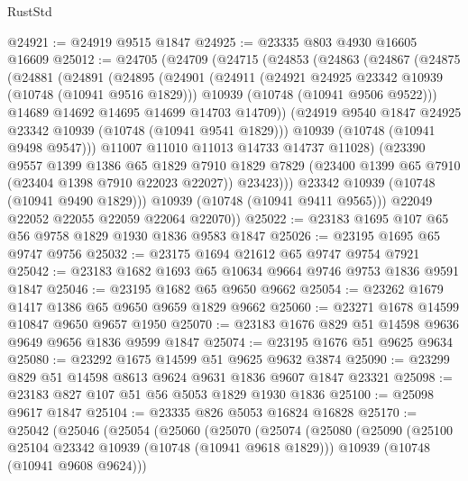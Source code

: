 \begin{lexlean}{RustStd}
\begin{coremodule}
@24921 := @24919 @9515 @1847
@24925 := @23335 @803 @4930 @16605 @16609
@25012 := @24705
    (@24709
      (@24715
        (@24853
          (@24863
            (@24867
              (@24875
                (@24881
                  (@24891
                    (@24895
                      (@24901
                        (@24911
                          (@24921 @24925 @23342 @10939 (@10748 (@10941 @9516 @1829)))
                          @10939
                          (@10748 (@10941 @9506 @9522)))
                        @14689
                        @14692
                        @14695
                        @14699
                        @14703
                        @14709))
                    (@24919 @9540 @1847 @24925 @23342 @10939 (@10748 (@10941 @9541 @1829)))
                    @10939
                    (@10748 (@10941 @9498 @9547)))
                  @11007
                  @11010
                  @11013
                  @14733
                  @14737
                  @11028)
                (@23390
                  @9557
                  @1399
                  @1386
                  @65
                  @1829
                  @7910
                  @1829
                  @7829
                  (@23400 @1399 @65 @7910 (@23404 @1398 @7910 @22023 @22027))
                  @23423)))
            @23342
            @10939
            (@10748 (@10941 @9490 @1829)))
          @10939
          (@10748 (@10941 @9411 @9565)))
        @22049
        @22052
        @22055
        @22059
        @22064
        @22070))
@25022 := @23183 @1695 @107 @65 @56 @9758 @1829 @1930 @1836 @9583 @1847
@25026 := @23195 @1695 @65 @9747 @9756
@25032 := @23175 @1694 @21612 @65 @9747 @9754 @7921
@25042 := @23183 @1682 @1693 @65 @10634 @9664 @9746 @9753 @1836 @9591 @1847
@25046 := @23195 @1682 @65 @9650 @9662
@25054 := @23262 @1679 @1417 @1386 @65 @9650 @9659 @1829 @9662
@25060 := @23271 @1678 @14599 @10847 @9650 @9657 @1950
@25070 := @23183 @1676 @829 @51 @14598 @9636 @9649 @9656 @1836 @9599 @1847
@25074 := @23195 @1676 @51 @9625 @9634
@25080 := @23292 @1675 @14599 @51 @9625 @9632 @3874
@25090 := @23299 @829 @51 @14598 @8613 @9624 @9631 @1836 @9607 @1847 @23321
@25098 := @23183 @827 @107 @51 @56 @5053 @1829 @1930 @1836
@25100 := @25098 @9617 @1847
@25104 := @23335 @826 @5053 @16824 @16828
@25170 := @25042
    (@25046
      (@25054
        (@25060
          (@25070
            (@25074
              (@25080
                (@25090
                  (@25100 @25104 @23342 @10939 (@10748 (@10941 @9618 @1829)))
                  @10939
                  (@10748 (@10941 @9608 @9624)))

\end{coremodule}
\end{lexlean}
